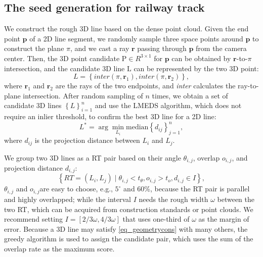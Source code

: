 \subsection{The seed generation for railway track}
We construct the rough 3D line based on the dense point cloud.
Given the end point $\mathbf p$ of a 2D line segment,
we randomly sample three space points around $\mathbf p$ to construct the plane $\pi$,
and we cast a ray $\mathbf r$ passing through $\mathbf p$ from the camera center.
Then,
the 3D point candidate $\mathrm P \in R ^ {3\times1}$ for $\mathbf p$ can be obtained by $\mathbf r$-to-$\pi$ intersection,
and the candidate 3D line $\mathrm L$ can be represented by the two 3D point:
\begin{equation}
    L =\left\{\textit{inter} \left(\pi,\mathbf r_1\right),\textit{inter} \left(\pi,\mathbf r_2\right)  \right\},
\end{equation}
where $\mathbf r_1$ and $\mathbf r_2$ are the rays of the two endpoints,
and \textit{inter} calculates the ray-to-plane intersection.
After random sampling of $n$ times,
we obtain a set of candidate 3D lines $\left\{ L\right\}_{i=1}^n$ and use the LMEDS algorithm,
which does not require an inlier threshold, to confirm the best 3D line for a 2D line:
\begin{equation}
    L^* = \arg\min_{L_i} \text{median} \left\{ d_{ij}\right\}_{j=1}^n ,
\end{equation}
where $d_{ij}$ is the projection distance between $L_i$ and $L_j$.  

We group two 3D lines as a RT pair based on their angle $\theta_{i,j}$,
overlap $o_{i,j}$,
and projection distance $d_{i,j}$:
\begin{equation}
   \left\{ RT= \left(L_i, L_j\right) \mid \theta_{i,j} < t_\theta, o_{i,j} > t_o, d_{i,j} \in I  \right\},
    \label{eq_geometrycons}
\end{equation}
$\theta_{i,j}$ and $o_{i,j}$are easy to choose,
e.g.,
$5^\circ$ and 60\%,
because the RT pair is parallel and highly overlapped;
while the interval $I$ needs the rough width $\omega$ between the two RT,
which can be acquired from construction standards or point clouds.
We recommend setting $I=\left[2/3\omega,4/3\omega\right]$ that uses one-third of $\omega$ as the margin of error.
Because a 3D line may satisfy \cref{eq_geometrycons} with many others,
the greedy algorithm is used to assign the candidate pair,
which uses the sum of the overlap rate as the maximum score.

